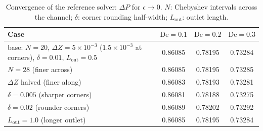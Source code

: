 \documentclass[11pt,a4paper]{article}
\newcommand{\De}{\mathrm{De}}
\begin{document}
\begin{table}[H]
\centering\small
\caption{Convergence of the reference solver: $\Delta P$ for $\epsilon\to0$. $N$: Chebyshev intervals across the channel; $\delta$: corner rounding half-width; $L_{\mathrm{out}}$: outlet length.}
\label{tab:conv}
\footnotesize
\begin{tabular}{@{}lccc@{}}
\toprule
Case & $\De=0.1$ & $\De=0.2$ & $\De=0.3$\\
\midrule
base: $N=20$, $\Delta Z=5\times10^{-3}$ ($1.5\times10^{-3}$ at corners), $\delta=0.01$, $L_{\mathrm{out}}=0.5$ & 0.86085 & 0.78195 & 0.73284\\
$N=28$ (finer across) & 0.86085 & 0.78195 & 0.73285\\
$\Delta Z$ halved (finer along) & 0.86083 & 0.78193 & 0.73281\\
$\delta=0.005$ (sharper corners) & 0.86081 & 0.78188 & 0.73275\\
$\delta=0.02$ (rounder corners) & 0.86089 & 0.78202 & 0.73292\\
$L_{\mathrm{out}}=1.0$ (longer outlet) & 0.86085 & 0.78195 & 0.73284\\
\bottomrule
\end{tabular}
\end{table}
\end{document}
